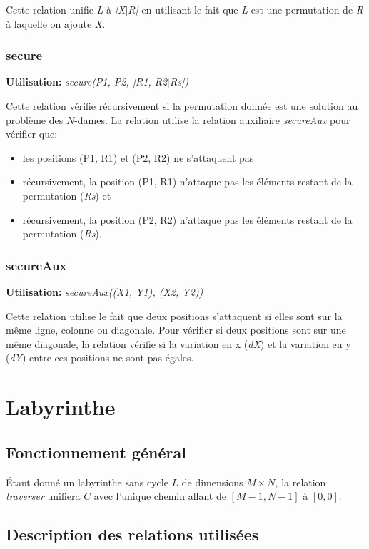 \documentclass[10pt]{article}
\newcommand{\usage}[1]{\textbf{Utilisation: }\emph{#1}}
\begin{document}
Cette relation unifie \emph{L} à \emph{[X$|$R]} en utilisant le fait
que \emph{L} est une permutation de \emph{R} à laquelle on ajoute
\emph{X}.

\subsubsection{secure}
\usage{secure(P1, P2, [R1, R2$|$Rs])}

Cette relation vérifie récursivement si la permutation donnée est une
solution au problème des $N$-dames. La relation utilise la relation
auxiliaire \emph{secureAux} pour vérifier que:
\begin{itemize}
\item les positions (P1, R1) et (P2, R2) ne s'attaquent pas
\item récursivement, la position (P1, R1) n'attaque pas les éléments
  restant de la permutation (\emph{Rs}) et
\item récursivement, la position (P2, R2) n'attaque pas les éléments
  restant de la permutation (\emph{Rs}).
\end{itemize}

\subsubsection{secureAux}
\usage{secureAux((X1, Y1), (X2, Y2))}

Cette relation utilise le fait que deux positions s'attaquent si elles
sont sur la même ligne, colonne ou diagonale. Pour vérifier si deux
positions sont sur une même diagonale, la relation vérifie si la
variation en x (\emph{dX}) et la variation en y (\emph{dY}) entre ces
positions ne sont pas égales.



\section{Labyrinthe}

\subsection{Fonctionnement général}

Étant donné un labyrinthe sans cycle $L$ de dimensions $M \times N$,
la relation \emph{traverser} unifiera $C$ avec l'unique chemin allant
de $[M-1, N-1]$ à $[0, 0]$.


\subsection{Description des relations utilisées}
\end{document}
